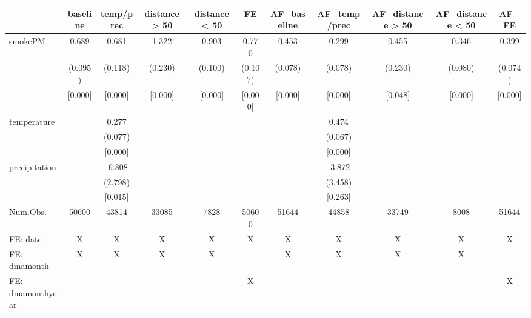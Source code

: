 \begin{table}
\centering
\begin{tabular}[t]{lcccccccccc}
\toprule
  & baseline & temp/prec & distance > 50 & distance < 50 & FE & AF\_baseline & AF\_temp/prec & AF\_distance > 50 & AF\_distance < 50 & AF\_FE\\
\midrule
smokePM & 0.689 & 0.681 & 1.322 & 0.903 & 0.770 & 0.453 & 0.299 & 0.455 & 0.346 & 0.399\\
 & (0.095) & (0.118) & (0.230) & (0.100) & (0.107) & (0.078) & (0.078) & (0.230) & (0.080) & (0.074)\\
 & {}[0.000] & {}[0.000] & {}[0.000] & {}[0.000] & {}[0.000] & {}[0.000] & {}[0.000] & {}[0.048] & {}[0.000] & {}[0.000]\\
temperature &  & 0.277 &  &  &  &  & 0.474 &  &  & \\
 &  & (0.077) &  &  &  &  & (0.067) &  &  & \\
 &  & {}[0.000] &  &  &  &  & {}[0.000] &  &  & \\
precipitation &  & -6.808 &  &  &  &  & -3.872 &  &  & \\
 &  & (2.798) &  &  &  &  & (3.458) &  &  & \\
 &  & {}[0.015] &  &  &  &  & {}[0.263] &  &  & \\
\midrule
Num.Obs. & 50600 & 43814 & 33085 & 7828 & 50600 & 51644 & 44858 & 33749 & 8008 & 51644\\
FE: date & X & X & X & X & X & X & X & X & X & X\\
FE: dmamonth & X & X & X & X &  & X & X & X & X & \\
FE: dmamonthyear &  &  &  &  & X &  &  &  &  & X\\
\bottomrule
\end{tabular}
\end{table}
